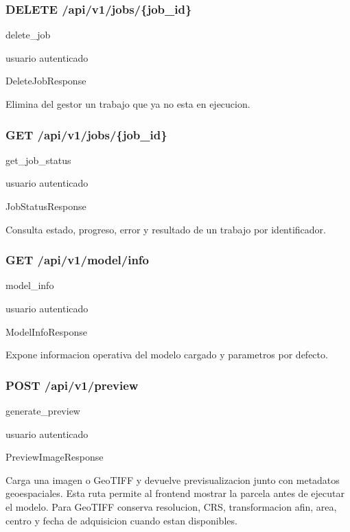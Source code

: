 \subsubsection*{DELETE /api/v1/jobs/\{job\_id\}}
\begin{description}[leftmargin=2.8cm,style=nextline]
\item[Handler] delete\_job
\item[Acceso] usuario autenticado
\item[Respuesta] DeleteJobResponse
\end{description}
Elimina del gestor un trabajo que ya no esta en ejecucion.


\subsubsection*{GET /api/v1/jobs/\{job\_id\}}
\begin{description}[leftmargin=2.8cm,style=nextline]
\item[Handler] get\_job\_status
\item[Acceso] usuario autenticado
\item[Respuesta] JobStatusResponse
\end{description}
Consulta estado, progreso, error y resultado de un trabajo por identificador.


\subsubsection*{GET /api/v1/model/info}
\begin{description}[leftmargin=2.8cm,style=nextline]
\item[Handler] model\_info
\item[Acceso] usuario autenticado
\item[Respuesta] ModelInfoResponse
\end{description}
Expone informacion operativa del modelo cargado y parametros por defecto.


\subsubsection*{POST /api/v1/preview}
\begin{description}[leftmargin=2.8cm,style=nextline]
\item[Handler] generate\_preview
\item[Acceso] usuario autenticado
\item[Respuesta] PreviewImageResponse
\end{description}
Carga una imagen o GeoTIFF y devuelve previsualizacion junto con metadatos geoespaciales. Esta ruta permite al frontend mostrar la parcela antes de ejecutar el modelo. Para GeoTIFF conserva resolucion, CRS, transformacion afin, area, centro y fecha de adquisicion cuando estan disponibles.


